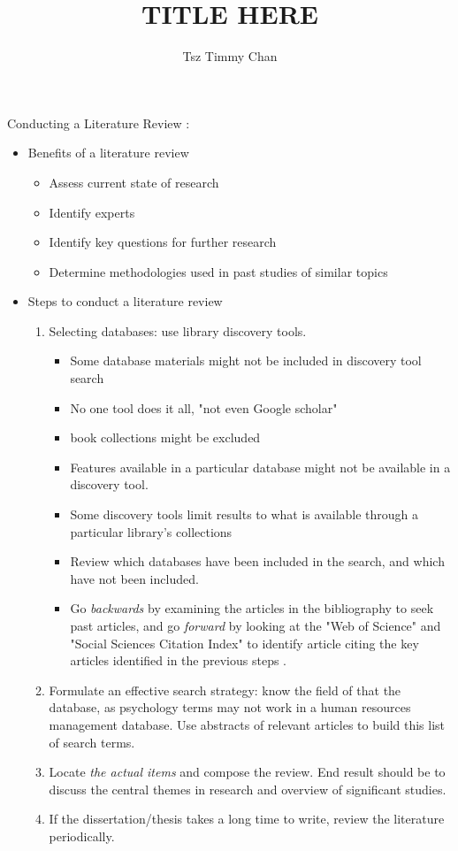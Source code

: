 \documentclass{TC}
\title{TITLE HERE}	%
\author{Tsz Timmy Chan}	%
\begin{document}
Conducting a Literature Review \parencite{alderman_conducting_2014}:
\begin{itemize}
\item Benefits of a literature review
	\begin{itemize}
	\item Assess current state of research
	\item Identify experts
	\item Identify key questions for further research
	\item Determine methodologies used in past studies of similar topics
	\end{itemize}
\item Steps to conduct a literature review
	\begin{enumerate}
	\item Selecting databases: use library discovery tools. 
		\begin{itemize}[\dangersign]
		\item Some database materials might not be included in discovery tool search
		\item No one tool does it all, "not even Google scholar"
		\item book collections might be excluded
		\item Features available in a particular database might not be available in a discovery tool.
		\item Some discovery tools limit results to what is available through a particular library's collections
		\item Review which databases have been included in the search, and which have not been included.
		\item Go \emph{backwards} by examining the articles in the bibliography to seek past articles, and go \emph{forward} by looking at the "Web of Science" and "Social Sciences Citation Index" to identify article citing the key articles identified in the previous steps \parencite{webster_analyzing_2002}. 
		\end{itemize} 
	\item Formulate an effective search strategy: know the field of that the database, as psychology terms may not work in a human resources management database. Use abstracts of relevant articles to build this list of search terms.
	\item Locate \textit{the actual items} and compose the review. End result should be to discuss the central themes in research and overview of significant studies.
	\item If the dissertation/thesis takes a long time to write, review the literature periodically.
	
	\end{enumerate}
\end{itemize}
\end{document}
